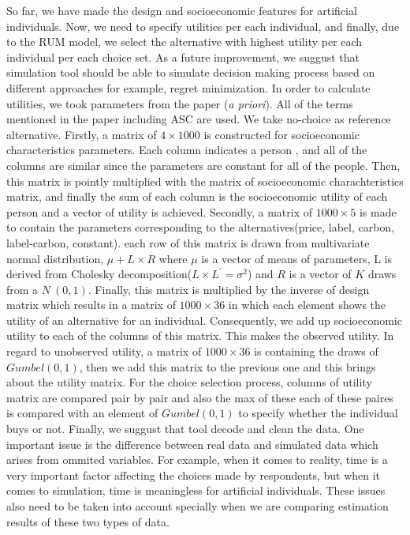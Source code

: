 \documentclass[12pt,]{article}
\begin{document}
So far, we have made the design and socioeconomic features for
artificial individuals. Now, we need to specify utilities per each
individual, and finally, due to the RUM model, we select the alternative
with highest utility per each individual per each choice set. As a
future improvement, we suggust that simulation tool should be able to
simulate decision making process based on different approaches for
example, regret minimization. In order to calculate utilities, we took
parameters from the paper (\emph{a priori}). All of the terms mentioned
in the paper including ASC are used. We take no-choice as reference
alternative. Firstly, a matrix of \(4\times 1000\) is constructed for
socioeconomic characteristics parameters. Each column indicates a person
, and all of the columns are similar since the parameters are constant
for all of the people. Then, this matrix is pointly multiplied with the
matrix of socioeconomic charachteristics matrix, and finally the sum of
each column is the socioeconomic utility of each person and a vector of
utility is achieved. Secondly, a matrix of \(1000\times 5\) is made to
contain the parameters corresponding to the alternatives(price, label,
carbon, label-carbon, constant). each row of this matrix is drawn from
multivariate normal distribution, \(\mu + L\times R\) where \(\mu\) is a
vector of means of parameters, L is derived from Cholesky
decomposition(\(L\times L^{\prime} = \sigma^2\)) and \(R\) is a vector
of \(K\) draws from a \(N~(0,1)\). Finally, this matrix is multiplied by
the inverse of design matrix which results in a matrix of
\(1000\times 36\) in which each element shows the utility of an
alternative for an individual. Consequently, we add up socioeconomic
utility to each of the columns of this matrix. This makes the observed
utility. In regard to unobserved utility, a matrix of \(1000\times 36\)
is containing the draws of \(Gumbel(0,1)\), then we add this matrix to
the previous one and this brings about the utility matrix. For the
choice selection process, columns of utility matrix are compared pair by
pair and also the max of these each of these paires is compared with an
element of \(Gumbel(0,1)\) to specify whether the individual buys or
not. Finally, we suggust that tool decode and clean the data. One
important issue is the difference between real data and simulated data
which arises from ommited variables. For example, when it comes to
reality, time is a very important factor affecting the choices made by
respondents, but when it comes to simulation, time is meaningless for
artificial individuals. These issues also need to be taken into account
specially when we are comparing estimation results of these two types of
data.
\end{document}
